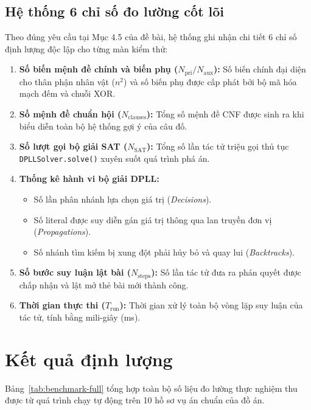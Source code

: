 \subsection{Hệ thống 6 chỉ số đo lường cốt lõi}
Theo đúng yêu cầu tại Mục 4.5 của đề bài, hệ thống ghi nhận chi tiết 6 chỉ số định lượng độc lập cho từng màn kiểm thử:
\begin{enumerate}
    \item \textbf{Số biến mệnh đề chính và biến phụ ($N_{\text{pri}} / N_{\text{aux}}$):} Số biến chính đại diện cho thân phận nhân vật ($n^2$) và số biến phụ được cấp phát bởi bộ mã hóa mạch đếm và chuỗi XOR.
    \item \textbf{Số mệnh đề chuẩn hội ($N_{\text{clauses}}$):} Tổng số mệnh đề CNF được sinh ra khi biểu diễn toàn bộ hệ thống gợi ý của câu đố.
    \item \textbf{Số lượt gọi bộ giải SAT ($N_{\text{SAT}}$):} Tổng số lần tác tử triệu gọi thủ tục \texttt{DPLLSolver.solve()} xuyên suốt quá trình phá án.
    \item \textbf{Thống kê hành vi bộ giải DPLL:}
    \begin{itemize}
        \item Số lần phân nhánh lựa chọn giá trị (\textit{Decisions}).
        \item Số literal được suy diễn gán giá trị thông qua lan truyền đơn vị (\textit{Propagations}).
        \item Số nhánh tìm kiếm bị xung đột phải hủy bỏ và quay lui (\textit{Backtracks}).
    \end{itemize}
    \item \textbf{Số bước suy luận lật bài ($N_{\text{steps}}$):} Số lần tác tử đưa ra phán quyết được chấp nhận và lật mở thẻ bài mới thành công.
    \item \textbf{Thời gian thực thi ($T_{\text{run}}$):} Thời gian xử lý toàn bộ vòng lặp suy luận của tác tử, tính bằng mili-giây (ms).
\end{enumerate}

\section{Kết quả định lượng}
\label{sec:ket-qua-dinh-luong}

Bảng~\ref{tab:benchmark-full} tổng hợp toàn bộ số liệu đo lường thực nghiệm thu được từ quá trình chạy tự động trên 10 hồ sơ vụ án chuẩn của đồ án.

